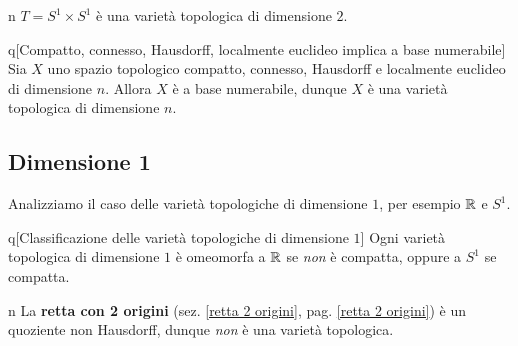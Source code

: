 \begin{example}{n}
	$T=S^1\times S^1$ è una varietà topologica di dimensione $2$.
\end{example}
\begin{theorem}{q}[Compatto, connesso, Hausdorff, localmente euclideo implica a base numerabile]\label{compattoconnessohausdorfflocalmenteuclideo}
Sia $X$ uno spazio topologico compatto, connesso, Hausdorff e localmente euclideo di dimensione $n$. Allora $X$ è a base numerabile, dunque $X$ è una varietà topologica di dimensione $n$.\qedhere
\end{theorem}
\subsection{Dimensione 1}
Analizziamo il caso delle varietà topologiche di dimensione $1$, per esempio $\mathbb{R}$ e $S^1$.
\begin{theorem}{q}[Classificazione delle varietà topologiche di dimensione $1$]
	Ogni varietà topologica di dimensione $1$ è omeomorfa a $\mathbb{R}$ se \emph{non} è compatta, oppure a $S^1$ se compatta.\qedhere
\end{theorem}
\begin{remark}{n}\label{retta2originivarietà}
La \textbf{retta con 2 origini} (sez. \ref{retta 2 origini}, pag. \ref{retta 2 origini}) è un quoziente non Hausdorff, dunque \textit{non} è una varietà topologica.
\end{remark}
